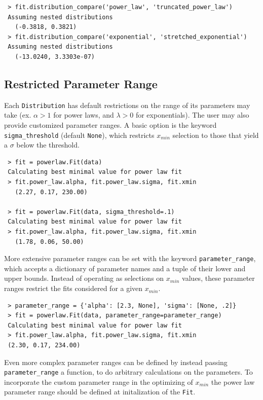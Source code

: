 \documentclass[10pt]{article}
\begin{document}
 \begin{verbatim}
 > fit.distribution_compare('power_law', 'truncated_power_law')
 Assuming nested distributions
   (-0.3818, 0.3821)
 > fit.distribution_compare('exponential', 'stretched_exponential')
 Assuming nested distributions
   (-13.0240, 3.3303e-07)
 \end{verbatim}
 
 \subsection*{Restricted Parameter Range}\label{FittingMethodology}
 Each \verb$Distribution$ has default restrictions on the range of its parameters may take (ex. $\alpha > 1$ for power laws, and $\lambda > 0$ for exponentials). The user may also provide customized parameter ranges. A basic option is the keyword \verb$sigma_threshold$ (default \verb$None$), which restricts $x_{min}$ selection to those that yield a $\sigma$ below the threshold. 
 
 \begin{verbatim}
 > fit = powerlaw.Fit(data)
 Calculating best minimal value for power law fit
 > fit.power_law.alpha, fit.power_law.sigma, fit.xmin
   (2.27, 0.17, 230.00)
   
 > fit = powerlaw.Fit(data, sigma_threshold=.1)
 Calculating best minimal value for power law fit
 > fit.power_law.alpha, fit.power_law.sigma, fit.xmin
   (1.78, 0.06, 50.00)  
 \end{verbatim}
 
 More extensive parameter ranges can be set with the keyword \verb$parameter_range$, which accepts a dictionary of parameter names and a tuple of their lower and upper bounds. Instead of operating as selections on $x_{min}$ values, these parameter ranges restrict the fits considered for a given $x_{min}$.
 
 \begin{verbatim}
 > parameter_range = {'alpha': [2.3, None], 'sigma': [None, .2]}
 > fit = powerlaw.Fit(data, parameter_range=parameter_range)
 Calculating best minimal value for power law fit
 > fit.power_law.alpha, fit.power_law.sigma, fit.xmin
 (2.30, 0.17, 234.00)
 \end{verbatim}
 
 Even more complex parameter ranges can be defined by instead passing \verb$parameter_range$ a function, to do arbitrary calculations on the parameters. To incorporate the custom parameter range in the optimizing of $x_{min}$ the power law parameter range should be defined at initalization of the \verb$Fit$.
  
\end{document}
